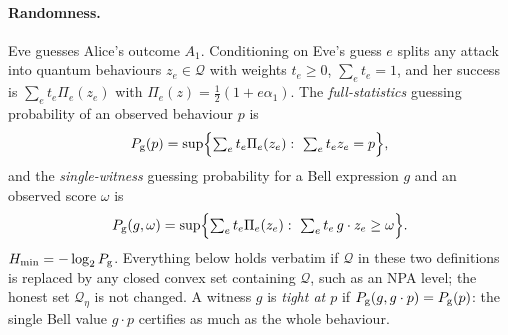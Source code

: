\documentclass[11pt]{article}
\theoremstyle{definition}\newtheorem{definition}{Definition}
\theoremstyle{remark}\newtheorem{remark}{Remark}
\newcommand{\Q}{\mathcal Q}
\newcommand{\Pg}{P_{\rm g}}
\begin{document}
\paragraph{Randomness.} Eve guesses Alice's outcome $A_1$. Conditioning on Eve's guess $e$ splits any attack into quantum behaviours $z_e\in\Q$ with weights $t_e\ge0$, $\sum_et_e=1$, and her success is $\sum_et_e\Pi_e(z_e)$ with $\Pi_e(z)=\frac12(1+e\alpha_1)$. The \emph{full-statistics} guessing probability of an observed behaviour $p$ is
\[
\Pg(p)=\sup\Bigl\{\textstyle\sum_et_e\Pi_e(z_e):\ \sum_et_ez_e=p\Bigr\},
\]
and the \emph{single-witness} guessing probability for a Bell expression $g$ and an observed score $\omega$ is
\[
\Pg(g,\omega)=\sup\Bigl\{\textstyle\sum_et_e\Pi_e(z_e):\ \sum_et_e\,g\cdot z_e\ge\omega\Bigr\}.
\]
$H_{\min}=-\log_2\Pg$. Everything below holds verbatim if $\Q$ in these two definitions is replaced by any closed convex set containing $\Q$, such as an NPA level; the honest set $\Q_\eta$ is not changed. A witness $g$ is \emph{tight at $p$} if $\Pg(g,g\cdot p)=\Pg(p)$: the single Bell value $g\cdot p$ certifies as much as the whole behaviour.
\end{document}
